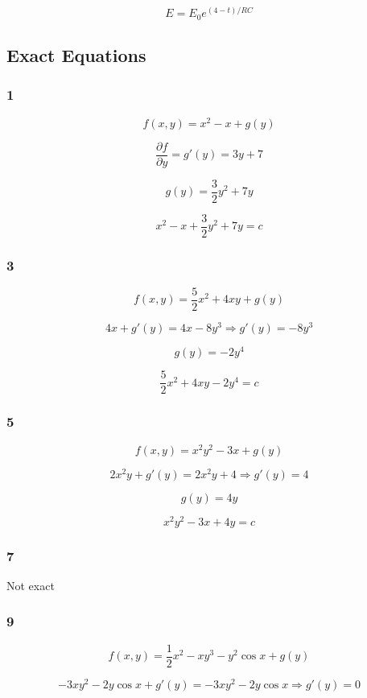 \documentclass{article}
\begin{document}
\[E = E_0 e^{(4 - t) / R C}\]

\subsection{Exact Equations}

\subsubsection{1}

\[f(x, y) = x^2 - x + g(y)\]

\[\frac{\partial f}{\partial y} = g'(y) = 3 y + 7\]

\[g(y) = \frac{3}{2} y^2 + 7 y\]

\[x^2 - x + \frac{3}{2} y^2 + 7 y = c\]

\subsubsection{3}

\[f(x, y) = \frac{5}{2} x^2 + 4 x y + g(y)\]

\[4 x + g'(y) = 4 x - 8 y^3 \Rightarrow g'(y) = -8 y^3\]

\[g(y) = -2 y^4\]

\[\frac{5}{2} x^2 + 4 x y - 2 y^4 = c\]

\subsubsection{5}

\[f(x, y) = x^2 y^2 - 3 x + g(y)\]

\[2 x^2 y + g'(y) = 2 x^2 y + 4 \Rightarrow g'(y) = 4\]

\[g(y) = 4 y\]

\[x^2 y^2 - 3 x + 4 y = c\]

\subsubsection{7}

Not exact

\subsubsection{9}

\[f(x, y) = \frac{1}{2} x^2 - x y^3 - y^2 \cos x + g(y)\]

\[-3 x y^2 - 2 y \cos x + g'(y) = -3 x y^2 - 2 y \cos x \Rightarrow g'(y) = 0\]
\end{document}
